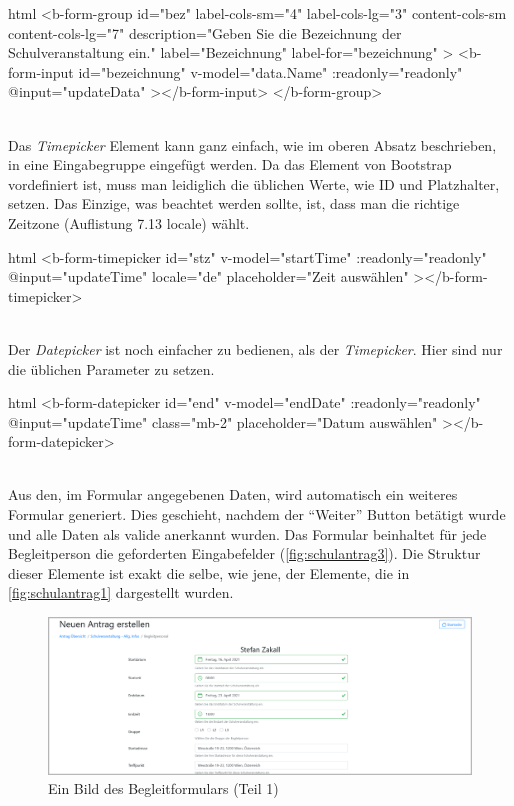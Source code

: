 \begin{code}{html}
	<b-form-group
        id="bez"
        label-cols-sm="4"
        label-cols-lg="3"
        content-cols-sm
        content-cols-lg="7"
        description="Geben Sie die Bezeichnung der Schulveranstaltung ein."
        label="Bezeichnung"
        label-for="bezeichnung"
    >
        <b-form-input
            id="bezeichnung"
            v-model="data.Name"
            :readonly="readonly"
            @input="updateData"
        ></b-form-input>
    </b-form-group>
\end{code}
~\\
Das \textit{Timepicker} Element kann ganz einfach, wie im oberen Absatz beschrieben, in eine Eingabegruppe eingefügt werden. Da das Element von Bootstrap vordefiniert ist, muss man leidiglich die üblichen Werte, wie ID und Platzhalter, setzen. Das Einzige, was beachtet werden sollte, ist, dass man die richtige Zeitzone (Auflistung 7.13 locale) wählt.
\begin{code}{html}
	<b-form-timepicker
		id="stz"
		v-model="startTime"
		:readonly="readonly"
		@input="updateTime"
		locale="de"
		placeholder="Zeit auswählen"
  	></b-form-timepicker>
\end{code}
~\\
Der \textit{Datepicker} ist noch einfacher zu bedienen, als der \textit{Timepicker}. Hier sind nur die üblichen Parameter zu setzen.
\begin{code}{html}
	<b-form-datepicker
		id="end"
		v-model="endDate"
		:readonly="readonly"
		@input="updateTime"
		class="mb-2"
		placeholder="Datum auswählen"
  	></b-form-datepicker>
\end{code}
	\label{list:bspinputgroup} ~\\
Aus den, im Formular angegebenen Daten, wird automatisch ein weiteres Formular generiert. Dies geschieht, nachdem der \enquote{Weiter} Button betätigt wurde und alle Daten als valide anerkannt wurden. Das Formular beinhaltet für jede Begleitperson die geforderten Eingabefelder (\autoref{fig:schulantrag3}). Die Struktur dieser Elemente ist exakt die selbe, wie jene, der Elemente, die in \autoref{fig:schulantrag1} dargestellt wurden. 
\begin{figure}[H]
	\centering
	\includegraphics[width=1\linewidth]{images/website/schul_3_1}
	\caption[Neuer Schulantrag]{Ein Bild des Begleitformulars (Teil 1)}
	\label{fig:schulantrag3}
\end{figure}
